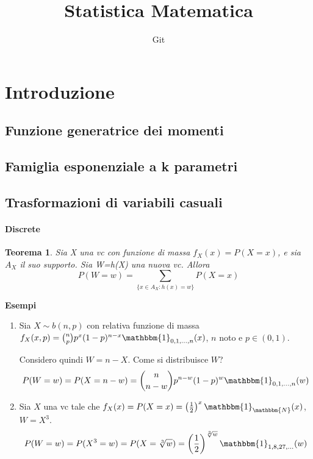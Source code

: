 \documentclass[11pt]{article}
\title{Statistica Matematica}
\author{Git}
\date{}
\newtheorem{teo}{Teorema}
\begin{document}
\maketitle


\section{Introduzione}
\subsection{Funzione generatrice dei momenti}
\subsection{Famiglia esponenziale a k parametri}
\subsection{Trasformazioni di variabili casuali}
\paragraph{Discrete}
\begin{teo}
Sia X una vc con funzione di massa $f_X(x)=P(X=x)$, e sia $A_X$ il suo supporto. 
Sia W=h(X) una nuova vc. Allora $$P(W=w)=\sum_{\{x\in A_X:h(x)=w\}}P(X=x)$$
\end{teo}

\textbf{Esempi}
\begin{enumerate}

\item Sia $X \sim b(n,p)$ con relativa funzione di massa 
$f_X(x,p)=\binom{n}{p}p^x(1-p)^{n-x}\mathbbm{1}_{0,1,...,n}(x)$,
$n$ noto e $p\in(0,1)$.

Considero quindi $W=n-X$. Come si distribuisce $W$? 
$$P(W=w)=P(X=n-w)=\binom{n}{n-w}p^{n-w}(1-p)^w\mathbbm{1}_{0,1,...,n}(w)$$
\item Sia $X$ una vc tale che 
$f_X(x)=P(X=x)=\left(\frac{1}{2}\right)^x\mathbbm{1}_\mathbbm{N}(x)$, $W=X^3$. 
$$P(W=w)=P(X^3=w)=P(X=\sqrt[3]{w})=\left(\frac{1}{2}\right)^{\sqrt[3]{w}}\mathbbm{1}_{1,8,27,...}(w)$$
\end{enumerate}
\end{document}
